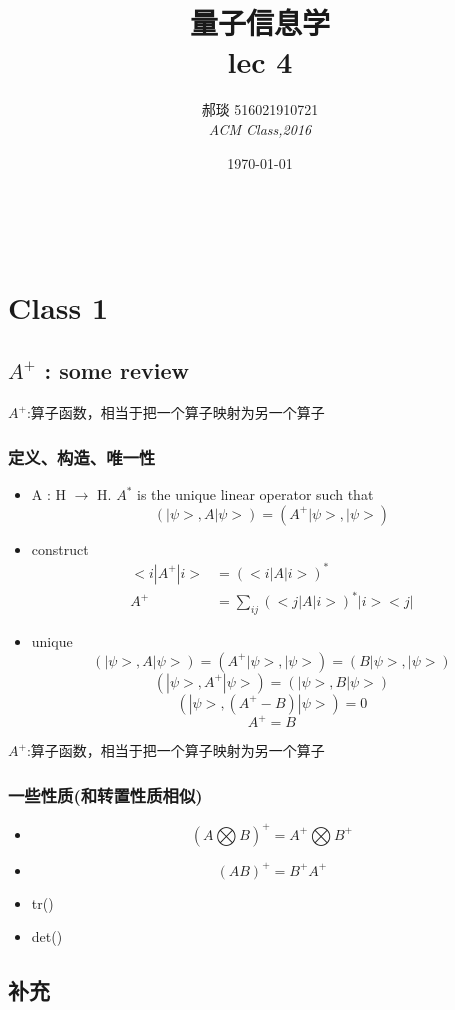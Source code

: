 \documentclass[a4paper, 11pt]{article} %
\title{\textbf{量子信息学}\\ %
lec 4} %
\author{\textsc{郝琰 516021910721} %
\\{\textit{ACM Class,2016}}} %
\date{\today} %
\makeatletter
\renewcommand{\maketitle}{ %

\begin{flushright} %
{\LARGE\@title} %

\vspace{50pt} %

{\large\@author} %
\\\@date %

\vspace{10pt} %
\end{flushright}
}
\makeatother
\begin{document}
\maketitle
\section{Class 1}


\subsection{$A^+$ : some review}
$A^+$:算子函数，相当于把一个算子映射为另一个算子
\subsubsection{定义、构造、唯一性}
\begin{itemize}
\item
A : H $\rightarrow$ H. $A^*$ is the unique linear operator such that
$$
(|\psi>, A|\psi >) = (A^+|\psi>, |\psi >)
$$
\item
construct
\begin{align*}
<i|A^+|i> & = (<i|A|i>)^* \\
A^+ &= \sum_{ij} (<j|A|i>)^*|i><j|
\end{align*}
\item
unique
$$
(|\psi>, A|\psi >) = (A^+|\psi>, |\psi >) = (B|\psi>, |\psi >)
$$
$$
(|\psi>, A^+|\psi >) = (|\psi>, B|\psi >)
$$
$$
(|\psi>, (A^+ - B)|\psi >) = 0
$$
$$
A^+ = B
$$
\end{itemize}

$A^+$:算子函数，相当于把一个算子映射为另一个算子

\subsubsection{一些性质(和转置性质相似)}

\begin{itemize}
	\item
	$$
	(A \bigotimes B)^+ = A^+ \bigotimes B^+
	$$
	\item
	$$
	(AB)^+ = B^+A^+
	$$
	\item
	tr()
	\item 
	det()
\end{itemize}

\subsection{补充}		
\end{document}
